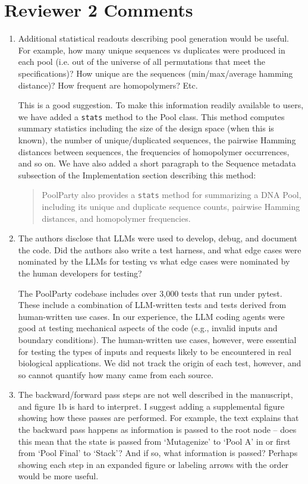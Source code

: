 \documentclass[11pt]{article}
\newenvironment{response}{\par\color{responseblue}}{\par}
\newenvironment{msquote}
  {\begin{quote}\color{quotedtext}\noindent\ignorespaces}
  {\end{quote}}
\newcommand{\responseheading}[1]{%
  \phantomsection
  \addcontentsline{toc}{section}{#1}%
  \section*{#1}}
\begin{document}
\responseheading{Reviewer 2 Comments}

\begin{enumerate}
\item Additional statistical readouts describing pool generation would be
useful. For example, how many unique sequences vs duplicates were produced in
each pool (i.e. out of the universe of all permutations that meet the
specifications)? How unique are the sequences (min/max/average hamming distance)?
How frequent are homopolymers? Etc.

\begin{response}
This is a good suggestion. To make this information readily available to users, we have added a \texttt{stats} method to the Pool class. This method computes summary statistics including the size of the design space (when this is known), the number of unique/duplicated sequences, the pairwise Hamming distances between sequences, the frequencies of homopolymer occurrences, and so on. We have also added a short paragraph to the Sequence metadata subsection of the Implementation section describing this method:
  \begin{msquote}
    PoolParty also provides a \texttt{stats} method for summarizing a DNA Pool, including its unique and duplicate sequence counts, pairwise Hamming distances, and homopolymer frequencies.
  \end{msquote}
\end{response}

\item The authors disclose that LLMs were used to develop, debug, and document the code. Did the authors also write a test harness, and what edge cases were nominated by the LLMs for testing vs what edge cases were nominated by the human developers for testing?

\begin{response}
The PoolParty codebase includes over 3{,}000 tests that run under pytest. These include a combination of LLM-written tests and tests derived from human-written use cases. In our experience, the LLM coding agents were good at testing mechanical aspects of the code (e.g., invalid inputs and boundary conditions). The human-written use cases, however, were essential for testing the types of inputs and requests likely to be encountered in real biological applications. We did not track the origin of each test, however, and so cannot quantify how many came from each source.  
\end{response}

\item The backward/forward pass steps are not well described in the manuscript,
and figure 1b is hard to interpret. I suggest adding a supplemental figure
showing how these passes are performed. For example, the text explains that the
backward pass happens as information is passed to the root node -- does this
mean that the state is passed from `Mutagenize' to `Pool A' in or first from
`Pool Final' to `Stack'? And if so, what information is passed? Perhaps showing
each step in an expanded figure or labeling arrows with the order would be more
useful.


\end{enumerate}
\end{document}
